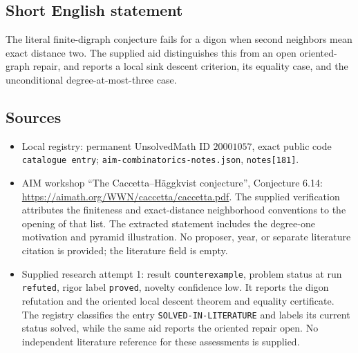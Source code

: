 \documentclass[11pt]{article}
\begin{document}
\subsection{Short English statement}
The literal finite-digraph conjecture fails for a digon when second neighbors mean exact distance two. The supplied aid distinguishes this from an open oriented-graph repair, and reports a local sink descent criterion, its equality case, and the unconditional degree-at-most-three case.
\subsection{Sources}
\begin{itemize}
\item Local registry: permanent UnsolvedMath ID \(20001057\), exact public code \texttt{catalogue entry}; \texttt{aim-combinatorics-notes.json}, \texttt{notes[181]}.
\item AIM workshop ``The Caccetta--Häggkvist conjecture'', Conjecture 6.14: \url{https://aimath.org/WWN/caccetta/caccetta.pdf}. The supplied verification attributes the finiteness and exact-distance neighborhood conventions to the opening of that list. The extracted statement includes the degree-one motivation and pyramid illustration. No proposer, year, or separate literature citation is provided; the literature field is empty.
\item Supplied research attempt 1: result \texttt{counterexample}, problem status at run \texttt{refuted}, rigor label \texttt{proved}, novelty confidence low. It reports the digon refutation and the oriented local descent theorem and equality certificate. The registry classifies the entry \texttt{SOLVED-IN-LITERATURE} and labels its current status solved, while the same aid reports the oriented repair open. No independent literature reference for these assessments is supplied.
\end{itemize}
\end{document}
